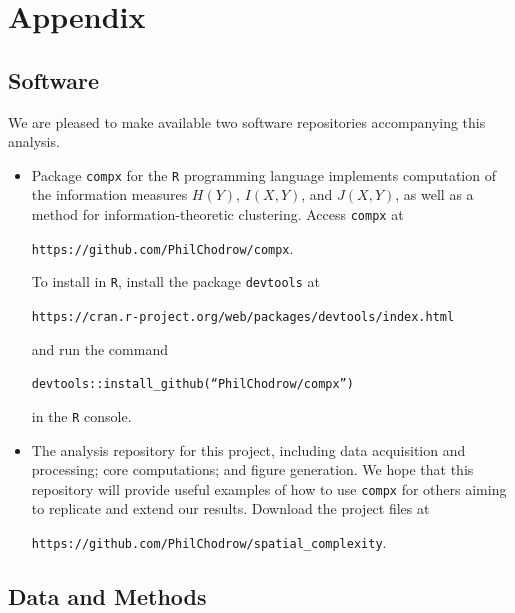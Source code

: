 \documentclass[english]{scrartcl}
\begin{document}
{}


\section*{Appendix}
	\subsection*{Software}
		We are pleased to make available two software repositories accompanying this analysis. 
		  \begin{itemize}
		    \item Package \texttt{compx} for the \texttt{R} programming language implements computation of the information measures $H(Y)$, $I(X,Y)$, and $J(X,Y)$, as well as a method for information-theoretic clustering. Access \texttt{compx} at 
		    \begin{displayquote}
		      \texttt{https://github.com/PhilChodrow/compx}. 
		    \end{displayquote}
		    To install in \texttt{R}, install the package \texttt{devtools} at 
		    \begin{displayquote}
		    \texttt{https://cran.r-project.org/web/packages/devtools/index.html}
		    \end{displayquote}
		     and run the command 
		    \begin{displayquote}
		      \texttt{devtools::install\_github(``PhilChodrow/compx'')}
		    \end{displayquote}
		    in the \texttt{R} console. 
		    \item The analysis repository for this project, including data acquisition and processing; core computations; and figure generation. We hope that this repository will provide useful examples of how to use \texttt{compx} for others aiming to replicate and extend our results. Download the project files at 
		    \begin{displayquote}
		      \texttt{https://github.com/PhilChodrow/spatial\_complexity}. 
		    \end{displayquote}
		  \end{itemize}

	\subsection*{Data and Methods}
\end{document}
